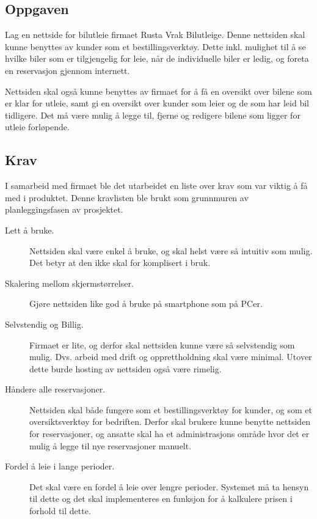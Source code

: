 \subsection{Oppgaven}

Lag en nettside for bilutleie firmaet Rusta Vrak Bilutleige. Denne nettsiden skal kunne benyttes av kunder som et bestillingsverktøy. Dette inkl. mulighet til å se hvilke biler som er tilgjengelig for leie, når de individuelle biler er ledig, og foreta en reservasjon gjennom internett.


Nettsiden skal også kunne benyttes av firmaet for å få en oversikt over bilene som er klar for utleie, samt gi en oversikt over kunder som leier og de som har leid bil tidligere. Det må være mulig å legge til, fjerne og redigere bilene som ligger for utleie forløpende.


\subsection{Krav} \label{kravliste1}
I samarbeid med firmaet ble det utarbeidet en liste over krav som var viktig å få med i produktet. Denne kravlisten ble brukt som grunnmuren av planleggingsfasen av prosjektet. 
\begin{description}
\item[Lett å bruke.]Nettsiden skal være enkel å bruke, og skal helst være så intuitiv som mulig. Det betyr at den ikke skal for komplisert i bruk.
\item[Skalering mellom skjermstørrelser.]Gjøre nettsiden like god å bruke på smartphone som på PCer.
\item[Selvstendig og Billig.]Firmaet er lite, og derfor skal nettsiden kunne være så selvstendig som mulig. Dvs. arbeid med drift og opprettholdning skal være minimal. Utover dette burde hosting av nettsiden også være rimelig.
\item[Håndere alle reservasjoner.]Nettsiden skal både fungere som et bestillingsverktøy for kunder, og som et oversiktsverktøy for bedriften. Derfor skal brukere kunne benytte nettsiden for reservasjoner, og ansatte skal ha et administrasjons område hvor det er mulig å legge til nye reservasjoner manuelt.
\item[Fordel å leie i lange perioder.]Det skal være en fordel å leie over lengre perioder. Systemet må ta hensyn til dette og det skal implementeres en funksjon for å kalkulere prisen i forhold til dette.
\end{description}

